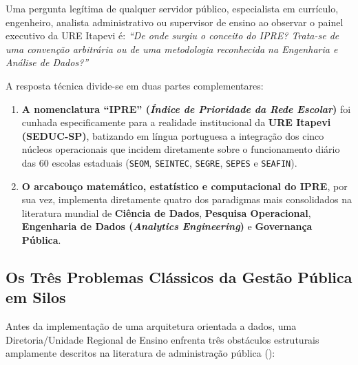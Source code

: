 \documentclass[9pt,a4paper]{extarticle}
\begin{document}
Uma pergunta legítima de qualquer servidor público, especialista em currículo, engenheiro, analista administrativo ou supervisor de ensino ao observar o painel executivo da URE Itapevi é: \emph{``De onde surgiu o conceito do IPRE? Trata-se de uma convenção arbitrária ou de uma metodologia reconhecida na Engenharia e Análise de Dados?''}

A resposta técnica divide-se em duas partes complementares:
\begin{enumerate}[leftmargin=1.5em, itemsep=3pt]
    \item \textbf{A nomenclatura ``IPRE'' (\emph{Índice de Prioridade da Rede Escolar})} foi cunhada especificamente para a realidade institucional da \textbf{URE Itapevi (SEDUC-SP)}, batizando em língua portuguesa a integração dos cinco núcleos operacionais que incidem diretamente sobre o funcionamento diário das 60 escolas estaduais (\texttt{SEOM}, \texttt{SEINTEC}, \texttt{SEGRE}, \texttt{SEPES} e \texttt{SEAFIN}).
    \item \textbf{O arcabouço matemático, estatístico e computacional do IPRE}, por sua vez, implementa diretamente quatro dos paradigmas mais consolidados na literatura mundial de \textbf{Ciência de Dados}, \textbf{Pesquisa Operacional}, \textbf{Engenharia de Dados (\emph{Analytics Engineering})} e \textbf{Governança Pública}.
\end{enumerate}

\subsection{Os Três Problemas Clássicos da Gestão Pública em Silos}

Antes da implementação de uma arquitetura orientada a dados, uma Diretoria/Unidade Regional de Ensino enfrenta três obstáculos estruturais amplamente descritos na literatura de administração pública (\cite{oecd2008, tcu2018}):
\end{document}
